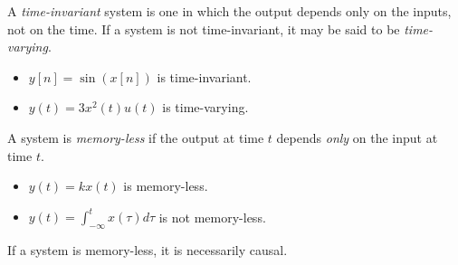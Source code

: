 \documentclass[12pt]{article}
\begin{document}
\begin{defn}
    A \emph{time-invariant} system is one in which the output depends only on the inputs, not on the time. If a system is not time-invariant, it may be said to be \emph{time-varying}.
\end{defn}

\begin{exmp}\proofbreak
    \begin{itemize}
        \item $y[n] = \sin(x[n])$ is time-invariant.
        \item $y(t) = 3x^2(t)u(t)$ is time-varying.
    \end{itemize}
\end{exmp}

\begin{defn}
    A system is \emph{memory-less} if the output at time $t$ depends \emph{only} on the input at time $t$.
\end{defn}

\begin{exmp}\proofbreak
    \begin{itemize}
        \item $y(t) = kx(t)$ is memory-less.
        \item $y(t) = \int_{-\infty}^{t}x(\tau)d\tau$ is not memory-less.
    \end{itemize}
\end{exmp}

\begin{rmk}
    If a system is memory-less, it is necessarily causal.
\end{rmk}
\end{document}
